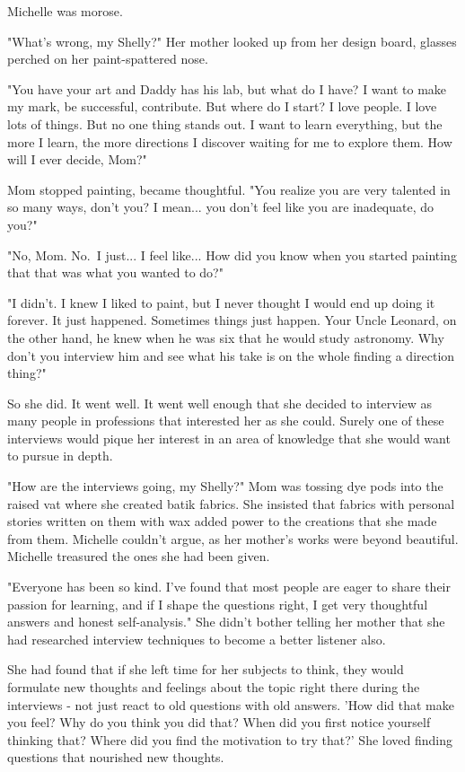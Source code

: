 
Michelle was morose.

"What's wrong, my Shelly?" Her mother looked up from her design board,
glasses perched on her paint-spattered nose.

"You have your art and Daddy has his lab, but what do I have? I want to
make my mark, be successful, contribute. But where do I start? I love
people. I love lots of things. But no one thing stands out. I want to
learn everything, but the more I learn, the more directions I discover
waiting for me to explore them. How will I ever decide, Mom?"

Mom stopped painting, became thoughtful. "You realize you are very
talented in so many ways, don't you? I mean... you don't feel like you
are inadequate, do you?"

"No, Mom. No.~I just... I feel like... How did you know when you started
painting that that was what you wanted to do?"

"I didn't. I knew I liked to paint, but I never thought I would end up
doing it forever. It just happened. Sometimes things just happen. Your
Uncle Leonard, on the other hand, he knew when he was six that he would
study astronomy. Why don't you interview him and see what his take is on
the whole finding a direction thing?"

So she did. It went well. It went well enough that she decided to
interview as many people in professions that interested her as she
could. Surely one of these interviews would pique her interest in an
area of knowledge that she would want to pursue in depth.

"How are the interviews going, my Shelly?" Mom was tossing dye pods into
the raised vat where she created batik fabrics. She insisted that
fabrics with personal stories written on them with wax added power to
the creations that she made from them. Michelle couldn't argue, as her
mother's works were beyond beautiful. Michelle treasured the ones she
had been given.

"Everyone has been so kind. I've found that most people are eager to
share their passion for learning, and if I shape the questions right, I
get very thoughtful answers and honest self-analysis." She didn't bother
telling her mother that she had researched interview techniques to
become a better listener also.

She had found that if she left time for her subjects to think, they
would formulate new thoughts and feelings about the topic right there
during the interviews - not just react to old questions with old
answers. 'How did that make you feel? Why do you think you did that?
When did you first notice yourself thinking that? Where did you find the
motivation to try that?' She loved finding questions that nourished new
thoughts.

